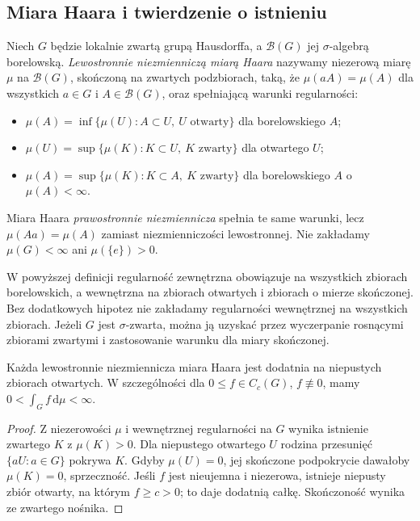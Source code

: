 \subsection*{Miara Haara i twierdzenie o istnieniu}
\begin{definicja}
Niech $G$ będzie lokalnie zwartą grupą Hausdorffa, a $\mathcal B(G)$ jej $\sigma$-algebrą borelowską. \emph{Lewostronnie niezmienniczą miarą Haara} nazywamy niezerową miarę $\mu$ na $\mathcal B(G)$, skończoną na zwartych podzbiorach, taką, że $\mu(aA)=\mu(A)$ dla wszystkich $a\in G$ i $A\in\mathcal B(G)$, oraz spełniającą warunki regularności:
\begin{itemize}
\item $\mu(A)=\inf\{\mu(U):A\subset U,\ U\text{ otwarty}\}$ dla borelowskiego $A$;
\item $\mu(U)=\sup\{\mu(K):K\subset U,\ K\text{ zwarty}\}$ dla otwartego $U$;
\item $\mu(A)=\sup\{\mu(K):K\subset A,\ K\text{ zwarty}\}$ dla borelowskiego $A$ o $\mu(A)<\infty$.
\end{itemize}
Miara Haara \emph{prawostronnie niezmiennicza} spełnia te same warunki, lecz $\mu(Aa)=\mu(A)$ zamiast niezmienniczości lewostronnej. Nie zakładamy $\mu(G)<\infty$ ani $\mu(\{e\})>0$.
\end{definicja}
\begin{uwaga}
W powyższej definicji regularność zewnętrzna obowiązuje na wszystkich zbiorach borelowskich, a wewnętrzna na zbiorach otwartych i zbiorach o mierze skończonej. Bez dodatkowych hipotez nie zakładamy regularności wewnętrznej na wszystkich zbiorach. Jeżeli $G$ jest $\sigma$-zwarta, można ją uzyskać przez wyczerpanie rosnącymi zbiorami zwartymi i zastosowanie warunku dla miary skończonej.
\end{uwaga}
\begin{lemat}
Każda lewostronnie niezmiennicza miara Haara jest dodatnia na niepustych zbiorach otwartych. W szczególności dla $0\le f\in C_c(G)$, $f\not\equiv0$, mamy $0<\int_G f\,\mathrm d\mu<\infty$.
\end{lemat}
\begin{proof}
Z niezerowości $\mu$ i wewnętrznej regularności na $G$ wynika istnienie zwartego $K$ z $\mu(K)>0$. Dla niepustego otwartego $U$ rodzina przesunięć $\{aU:a\in G\}$ pokrywa $K$. Gdyby $\mu(U)=0$, jej skończone podpokrycie dawałoby $\mu(K)=0$, sprzeczność. Jeśli $f$ jest nieujemna i niezerowa, istnieje niepusty zbiór otwarty, na którym $f\ge c>0$; to daje dodatnią całkę. Skończoność wynika ze zwartego nośnika.
\end{proof}
